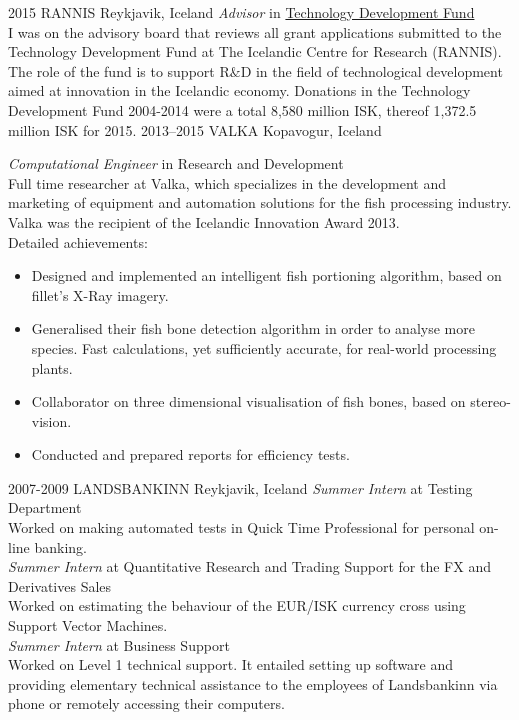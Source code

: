 \documentclass[]{cv} %
\begin{document}
\begin{entrylist}
\entry
{2015}
{RANNIS}
{Reykjavik, Iceland}
{\emph{Advisor} in 
\href{http://www.rannis.is/sjodir/rannsoknir/taeknithrounarsjodur/fagrad/}{Technology
 Development Fund}\\
I was on the advisory board that reviews all grant applications submitted to 
the  Technology Development Fund at The Icelandic Centre for Research (RANNIS).
The role of the fund is to support R$\&$D in the field of technological 
development aimed at innovation in the Icelandic economy.
Donations in the Technology Development Fund 2004-2014 were a total 8,580 
million ISK, thereof 1,372.5 million ISK for 2015.
}
\entry
{2013--2015}
{VALKA}
{Kopavogur, Iceland}
{\emph{Computational Engineer} in Research and Development \\
Full time researcher at Valka, which specializes in the development and marketing of equipment and automation solutions for the fish processing industry. Valka was the recipient of the Icelandic Innovation Award 2013. \\
Detailed achievements:
\begin{itemize}
\item Designed and implemented an intelligent fish portioning algorithm, based 
on fillet's X-Ray imagery. 
\item Generalised their fish bone detection algorithm in order to analyse more species. Fast calculations, yet sufficiently accurate, for real-world processing plants.
\item Collaborator on three dimensional visualisation of fish bones, based on stereo-vision.
\item Conducted and prepared reports for efficiency tests.
\end{itemize}
}
\entry
{2007-2009}
{LANDSBANKINN}
{Reykjavik, Iceland}
{
\emph{Summer Intern} at Testing Department \\ Worked on making automated tests 
in Quick Time Professional for personal on-line banking. 
\\
\emph{Summer Intern} at Quantitative Research and Trading Support for the FX and Derivatives Sales \\ Worked on estimating the behaviour of the EUR/ISK currency cross using Support Vector Machines.
\\
\emph{Summer Intern} at Business Support \\ Worked on Level 1 technical support. It entailed setting up software and providing elementary technical assistance to the employees of Landsbankinn via phone or remotely accessing their computers.
}
\end{entrylist}
\end{document}
